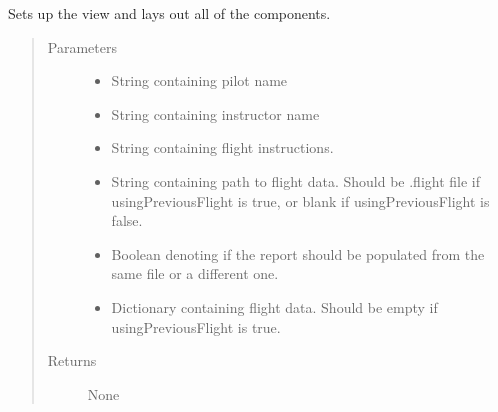 \documentclass[letterpaper,10pt,english]{sphinxmanual}
\begin{document}
\begin{fulllineitems}
\begin{fulllineitems}
\label{\detokenize{index:src.Views.View_ReportScreen.ReportWindow.initView}}
Sets up the view and lays out all of the components.
\begin{quote}\begin{description}
\item[{Parameters}] \leavevmode\begin{itemize}
\item {} 
 \textendash{} String containing pilot name

\item {} 
 \textendash{} String containing instructor name

\item {} 
 \textendash{} String containing flight instructions.

\item {} 
 \textendash{} String containing path to flight data. Should be .flight file if usingPreviousFlight is true, or blank if usingPreviousFlight is false.

\item {} 
 \textendash{} Boolean denoting if the report should be populated from the same file or a different one.

\item {} 
 \textendash{} Dictionary containing flight data. Should be empty if usingPreviousFlight is true.

\end{itemize}

\item[{Returns}] \leavevmode
None

\end{description}\end{quote}

\end{fulllineitems}



\end{fulllineitems}
\end{document}
